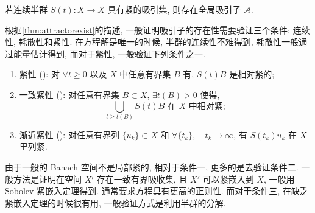\documentclass[oneside,longtitle]{LZUthesis}
\numberwithin{equation}{chapter}
\newcommand*\Brace[1]{\lbrace#1\rbrace}
\begin{document}
\begin{theorem}\label{thm:attractorexist}
	若连续半群 $S(t): X \to X$ 具有紧的吸引集, 则存在全局吸引子 $\mathcal{A}$.
\end{theorem}
根据\cref{thm:attractorexist}的描述, 一般证明吸引子的存在性需要验证三个条件:
连续性, 耗散性和紧性. 在方程解是唯一的时候, 半群的连续性不难得到,
耗散性一般通过能量估计得到, 而对于紧性, 一般验证下列条件之一.
\begin{enumerate}[itemindent = -1em]
	\item 紧性 (\citep{temamInfiniteDimensionalDynamicalSystems1997}): 对 $\forall t \geq 0$ 以及 $X$ 中任意有界集 $B$ 有, $S(t)B$ 是相对紧的;
	\item 一致紧性 (\citep{babinAttractorsEvolutionEquations1992a,robinsonInfiniteDimensionalDynamicalSystems2001a}): 对任意有界集 $B \subset X$, $\exists t(B) > 0$ 使得,
	\begin{equation*}
		\bigcup_{t \geq t(B)} S(t)B \text{ 在 } X \text{ 中相对紧};
	\end{equation*}
	\item 渐近紧性 (\citep{ladyzhenskayaAttractorsSemigroupsEvolution1991}): 对任意有界列 $\Brace{u_k} \subset X$ 和
	$\forall \Brace{t_k}, \quad t_k \to \infty$, 有 $S(t_k)u_k$ 在 $X$ 里列紧.
\end{enumerate}

由于一般的 Banach 空间不是局部紧的, 相对于条件一, 更多的是去验证条件二.
一般方法是证明在空间 $X‘$ 存在一致有界吸收集, 且 $X'$ 可以紧嵌入到 $X$,
一般用 Sobolev 紧嵌入定理得到. 通常要求方程具有更高的正则性. 而对于条件三,
在缺乏紧嵌入定理的时候很有用, 一般验证方式是利用半群的分解.
\end{document}

